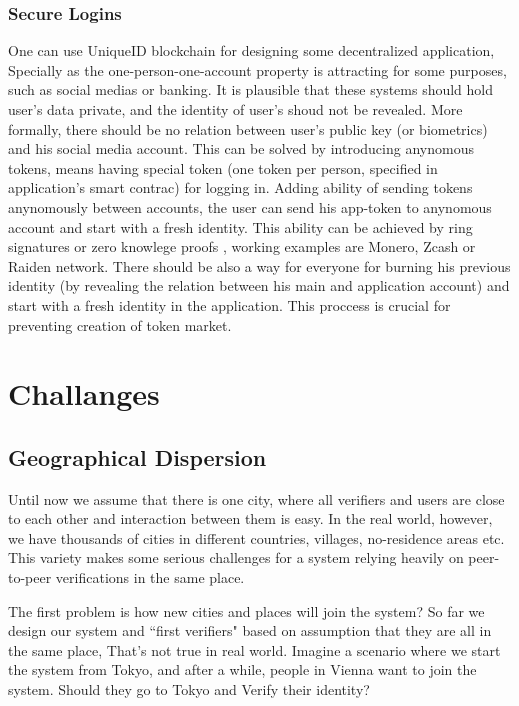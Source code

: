 \documentclass[conference]{IEEEtran}
\begin{document}
\subsubsection*{Secure Logins}
One can use UniqueID blockchain for designing some decentralized application, Specially as the one-person-one-account property is attracting for some purposes, such as social medias or banking. It is plausible that these systems should hold user's data private, and the identity of user's shoud not be revealed. More formally, there should be no relation between user's public key (or biometrics) and his social media account. This can be solved by introducing anynomous tokens, means having special token (one token per person, specified in application's smart contrac) for logging in. Adding ability of sending tokens anynomously between accounts, the user can send his app-token to anynomous account and start with a fresh identity. This ability can be achieved by ring signatures \cite{RingSig} or zero knowlege proofs \cite{ZeroKnowledge}, working examples are  Monero, Zcash or Raiden network. There should be also a way for everyone for burning his previous identity (by revealing the relation between his main and application account) and start with a fresh identity in the application. This proccess is crucial for preventing creation of token market.



\section{Challanges}


\subsection{Geographical Dispersion}
Until now we assume that there is one city, where all verifiers and users are close to each other and interaction between them is easy. In the real world, however, we have thousands of cities in different countries, villages, no-residence areas etc. This variety makes some serious challenges for a system relying heavily on peer-to-peer verifications in the same place.


The first problem is how new cities and places will join the system? So far we design our system and ``first verifiers" based on assumption that they are all in the same place, That's not true in real world. Imagine a scenario where we start the system from Tokyo, and after a while, people in Vienna want to join the system. Should they go to Tokyo and Verify their identity?
\end{document}
